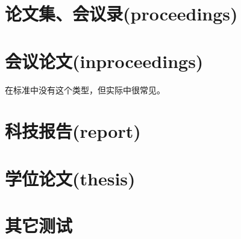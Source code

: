\documentclass{article}
\begin{document}
\section{论文集、会议录(proceedings)}\newrefsection
\nocite{aproceedings1}
\nocite{aproceedings2}
\nocite{aproceedings3}
\printbibliography[heading=nobibhead]

\section{会议论文(inproceedings)}\newrefsection
在标准中没有这个类型，但实际中很常见。
\nocite{inproceeding1}
\nocite{ay5}
\nocite{ay7}
\printbibliography[heading=nobibhead]

\section{科技报告(report)}\newrefsection
\nocite{areport1}
\nocite{areport2}
\printbibliography[heading=nobibhead]

\section{学位论文(thesis)}\newrefsection
\nocite{athesis1}
\nocite{athesis2}
\printbibliography[heading=nobibhead]


\section{其它测试}\newrefsection
\nocite{booknoauthor}
\nocite{booknolocation}
\nocite{booknopublisher}
\nocite{booknodate}
\nocite{booknopages}
\nocite{bookadd1}
\nocite{inproceeding1}
\nocite{articlemorenames}
\nocite{bookmoretranslators}
\printbibliography[heading=bibhead]
\end{document}
